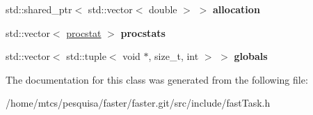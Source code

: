 \begin{DoxyCompactItemize}
\hypertarget{classfaster_1_1fastTask_a84768f55711ad87949579bf0c2ae8783}{}\label{classfaster_1_1fastTask_a84768f55711ad87949579bf0c2ae8783} 
std\+::shared\+\_\+ptr$<$ std\+::vector$<$ double $>$ $>$ {\bfseries allocation}
\item 
\hypertarget{classfaster_1_1fastTask_aac49582ce19072b081c72492c3a819e0}{}\label{classfaster_1_1fastTask_aac49582ce19072b081c72492c3a819e0} 
std\+::vector$<$ \hyperlink{classfaster_1_1procstat}{procstat} $>$ {\bfseries procstats}
\item 
\hypertarget{classfaster_1_1fastTask_a7e0e6d2663f6b913ba7467d4a3810b06}{}\label{classfaster_1_1fastTask_a7e0e6d2663f6b913ba7467d4a3810b06} 
std\+::vector$<$ std\+::tuple$<$ void $\ast$, size\+\_\+t, int $>$ $>$ {\bfseries globals}
\end{DoxyCompactItemize}


The documentation for this class was generated from the following file\+:\begin{DoxyCompactItemize}
\item 
/home/mtcs/pesquisa/faster/faster.\+git/src/include/fast\+Task.\+h\end{DoxyCompactItemize}
